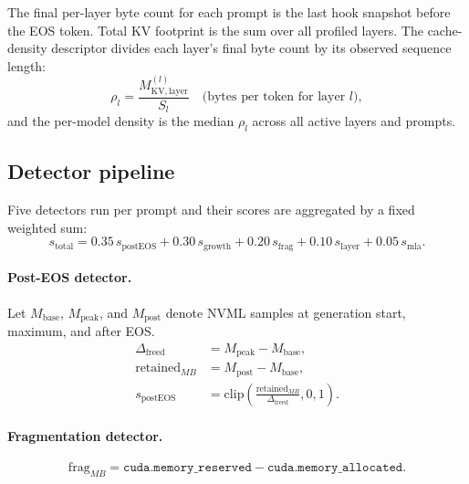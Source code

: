 \documentclass[11pt,a4paper]{article}
\begin{document}
The final per-layer byte count for each prompt is the last hook
snapshot before the EOS token.
Total KV footprint is the sum over all profiled layers.
The cache-density descriptor divides each layer's final byte count
by its observed sequence length:
\begin{equation}
  \rho_l = \frac{M_\mathrm{KV,layer}^{(l)}}{S_l}
           \quad\text{(bytes per token for layer }l\text{)},
\end{equation}
and the per-model density is the median $\rho_l$ across all active
layers and prompts.

\subsection{Detector pipeline}
\label{sec:methods:detectors}

Five detectors run per prompt and their scores are aggregated by a
fixed weighted sum:
\begin{equation}
  s_\mathrm{total}
  = 0.35\,s_\mathrm{postEOS}
  + 0.30\,s_\mathrm{growth}
  + 0.20\,s_\mathrm{frag}
  + 0.10\,s_\mathrm{layer}
  + 0.05\,s_\mathrm{mla}.
  \label{eq:score}
\end{equation}

\paragraph{Post-EOS detector.}
Let $M_\mathrm{base}$, $M_\mathrm{peak}$, and $M_\mathrm{post}$
denote NVML samples at generation start, maximum, and after EOS.
\begin{align}
  \Delta_\mathrm{freed}
    &= M_\mathrm{peak} - M_\mathrm{base}, \label{eq:freed}\\
  \mathrm{retained}_{MB}
    &= M_\mathrm{post} - M_\mathrm{base},  \label{eq:retained}\\
  s_\mathrm{postEOS}
    &= \mathrm{clip}\!\left(
         \frac{\mathrm{retained}_{MB}}{\Delta_\mathrm{freed}},
         0, 1
       \right). \label{eq:posteos}
\end{align}

\paragraph{Fragmentation detector.}
\begin{equation}
  \mathrm{frag}_{MB}
  = \texttt{cuda.memory\_reserved} - \texttt{cuda.memory\_allocated}.
  \label{eq:frag}
\end{equation}
\end{document}
